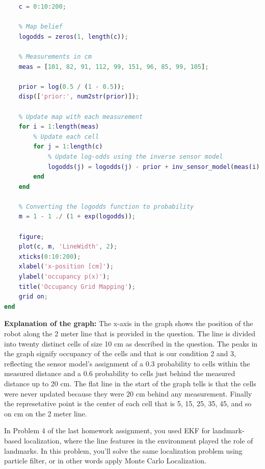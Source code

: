 \documentclass[answers]{exam}
\begin{document}
\begin{questions}
\begin{solution}
\begin{lstlisting}[language=Matlab, caption=Occupancy Grid Mapping, label={lst:code}]
    % We divide our path of 2 meter into grids of 10 cm
    c = 0:10:200;

    % Map belief
    logodds = zeros(1, length(c));

    % Measurements in cm
    meas = [101, 82, 91, 112, 99, 151, 96, 85, 99, 105];

    prior = log(0.5 / (1 - 0.5));
    disp(['prior:', num2str(prior)]);

    % Update map with each measurement
    for i = 1:length(meas)
        % Update each cell
        for j = 1:length(c)
            % Update log-odds using the inverse sensor model
            logodds(j) = logodds(j) - prior + inv_sensor_model(meas(i), c(j));
        end
    end

    % Converting the logodds function to probability 
    m = 1 - 1 ./ (1 + exp(logodds));

    figure;
    plot(c, m, 'LineWidth', 2);
    xticks(0:10:200);
    xlabel('x-position [cm]');
    ylabel('occupancy p(x)');
    title('Occupancy Grid Mapping');
    grid on;
end     
        \end{lstlisting}

        \textbf{Explanation of the graph:} The x-axis in the graph shows the position of the robot along the 2 meter line that is provided in the question. The line is divided into twenty distinct cells of size 10 cm as described in the question. The peaks in the graph signify occupancy of the cells and that is our condition 2 and 3, reflecting the sensor model's assignment of a 0.3 probability to cells within the measured distance and a 0.6 probability to cells just behind the measured distance up to 20 cm. The flat line in the start of the graph tells is that the cells were never updated because they were 20 cm behind any measurement. Finally the represetative point is the center of each cell that is 5, 15, 25, 35, 45, and so on cm on the 2 meter line.

    \end{solution}

    \question[25]
    In Problem 4 of the last homework assignment, you used EKF for landmark-based localization, where the line features in the environment played the role of landmarks. In this problem, you'll solve the same localization problem using particle filter, or in other words apply Monte Carlo Localization.
\end{questions}
\end{document}

